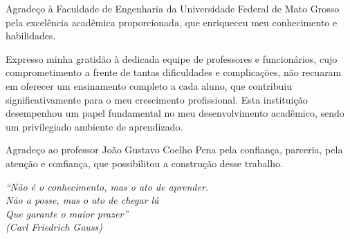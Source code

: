 \begin{agradecimentos}
    Agradeço à Faculdade de Engenharia da Universidade Federal de Mato Grosso pela excelência acadêmica proporcionada, que enriqueceu meu conhecimento e habilidades. 
    
    Expresso minha gratidão à dedicada equipe de professores e funcionários, cujo comprometimento a frente de tantas dificuldades e complicações, não recuaram em oferecer um ensinamento completo a cada aluno, que contribuiu significativamente para o meu crescimento profissional. Esta instituição desempenhou um papel fundamental no meu desenvolvimento acadêmico, sendo um privilegiado ambiente de aprendizado.
    
    Agradeço ao professor João Gustavo Coelho Pena pela confiança, parceria, pela atenção e confiança, que possibilitou a construção desse trabalho. 
\end{agradecimentos}

\begin{epigrafe}
    \vspace*{\fill}
    \begin{flushright}
        \textit{``Não é o conhecimento, mas o ato de aprender.\\
        Não a posse, mas o ato de chegar lá\\
        Que garante o maior prazer''\\
        (Carl Friedrich Gauss)}
    \end{flushright}
\end{epigrafe}

